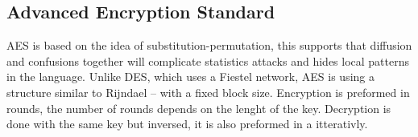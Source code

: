 \subsection{Advanced Encryption Standard}
AES is based on the idea of substitution-permutation\cite{AESISFAST:Online}, this supports that
diffusion and confusions together will complicate statistics attacks and hides
local patterns in the language. Unlike DES, which uses a Fiestel network,
AES is using a structure  similar to Rijndael – with a fixed block size.
Encryption is preformed in rounds, the number of rounds depends on the lenght of the key. Decryption is done with the same key but inversed, it is also preformed in a itterativly.
